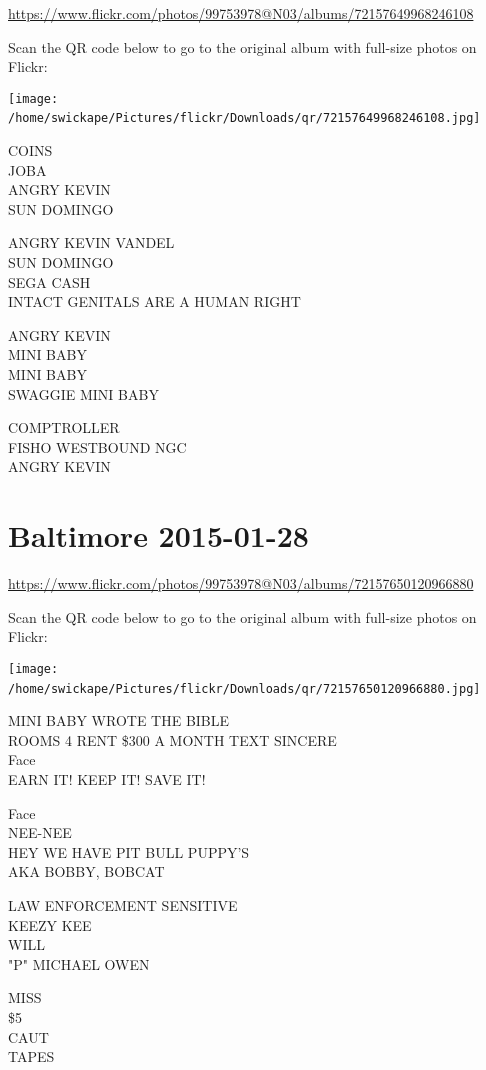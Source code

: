 \documentclass[10pt,letterpaper]{article}
\begin{document}
\url{https://www.flickr.com/photos/99753978@N03/albums/72157649968246108}

Scan the QR code below to go to the original album with full-size photos on Flickr:

\texttt{[image: /home/swickape/Pictures/flickr/Downloads/qr/72157649968246108.jpg]}
\

COINS\\
JOBA\\
ANGRY KEVIN\\
SUN DOMINGO

ANGRY KEVIN VANDEL\\
SUN DOMINGO\\
SEGA CASH\\
INTACT GENITALS ARE A HUMAN RIGHT

ANGRY KEVIN\\
MINI BABY\\
MINI BABY\\
SWAGGIE MINI BABY

COMPTROLLER\\
FISHO WESTBOUND NGC\\
ANGRY KEVIN
\

\section*{Baltimore 2015-01-28}

\url{https://www.flickr.com/photos/99753978@N03/albums/72157650120966880}

Scan the QR code below to go to the original album with full-size photos on Flickr:

\texttt{[image: /home/swickape/Pictures/flickr/Downloads/qr/72157650120966880.jpg]}
\

MINI BABY WROTE THE BIBLE\\
ROOMS 4 RENT \$300 A MONTH TEXT SINCERE\\
Face\\
EARN IT!  KEEP IT!  SAVE IT!

Face\\
NEE{-}NEE\\
HEY WE HAVE PIT BULL PUPPY'S\\
AKA BOBBY, BOBCAT

LAW ENFORCEMENT SENSITIVE\\
KEEZY KEE\\
WILL\\
"P" MICHAEL OWEN

MISS\\
\$5\\
CAUT\\
TAPES
\end{document}
